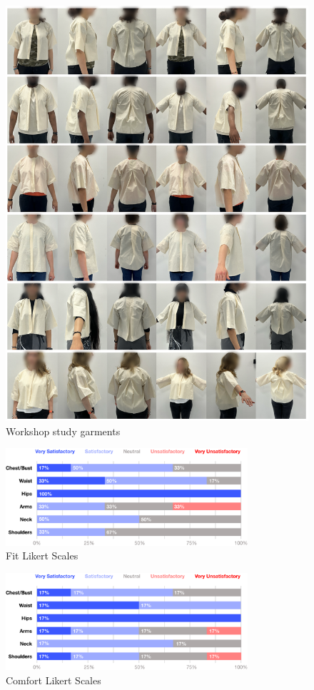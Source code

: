 \newpage
\begin{figure} [H]
    \centering
    \includegraphics[width = \textwidth]{Images/workshop garments.png}
    \caption{Workshop study garments}
    \label{fig:workshop_garments}
\end{figure}

\begin{figure} [H]
    \centering
    \includegraphics[width = 0.8\textwidth]{Images/fit likert stacked bar.png}
    \caption{Fit Likert Scales}
\end{figure}
\begin{figure} [htb]
    \centering
    \includegraphics[width = 0.8\textwidth]{Images/comfort likert stacked bar.png}
    \caption{Comfort Likert Scales}
\end{figure}


